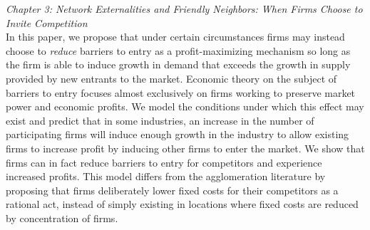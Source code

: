 \documentclass[margin]{res}  %
\begin{document}
\begin{adjustwidth}{-5em}{5em}
\textit{Chapter 3: Network Externalities and Friendly Neighbors: When Firms Choose to Invite Competition}\\

In this paper, we propose that under certain circumstances firms may instead choose to \emph{reduce} barriers to entry as a profit-maximizing mechanism so long as the firm is able to induce growth in demand that exceeds the growth in supply provided by new entrants to the market. Economic theory on the subject of barriers to entry focuses almost exclusively on firms working to preserve market power and economic profits. We model the conditions under which this effect may exist and predict that in some industries, an increase in the number of participating firms will induce enough growth in the industry to allow existing firms to increase profit by inducing other firms to enter the market. We show that firms can in fact reduce barriers to entry for competitors and experience increased profits. This model differs from the agglomeration literature by proposing that firms deliberately lower fixed costs for their competitors as a rational act, instead of simply existing in locations where fixed costs are reduced by concentration of firms.

\end{adjustwidth}
\end{document}
